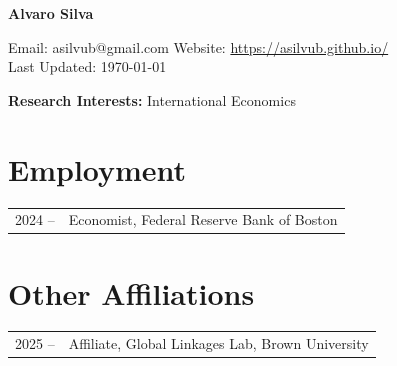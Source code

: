 \documentclass[10pt]{article}
\begin{document}
\begin{center}
\begin{Large} \bfseries Alvaro Silva\end{Large} 
\end{center}


\vspace*{0.2in}
\noindent Email: asilvub@gmail.com \hfill Website: \href{https://asilvub.github.io/}{https://asilvub.github.io/} \\
Last Updated: \today\\

\vspace*{-0.1in}


\noindent \textbf{\normalsize Research Interests: } International Economics

\section*{Employment}
\begin{tabular}{@{}p{1.8cm}p{13cm}}
    2024 -- & Economist, Federal Reserve Bank of Boston
\end{tabular}

\section*{Other Affiliations}
\begin{tabular}{@{}p{1.8cm}p{13cm}}
    2025 -- & Affiliate, Global Linkages Lab, Brown University
\end{tabular}
\end{document}
